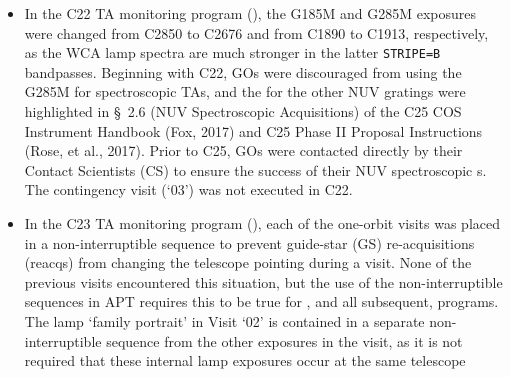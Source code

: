 \begin{itemize}
{The optional parameter \texttt{WAVECAL=YES} in the BOA$\times$MIRA target+Lamp image of the C20 program was discovered to not have taken the
expected internal lamp image in the \textsf{LC6601RYQ\_rawtag.fits} exposure. Correcting this inconsistency would have required significant APT, TRANS, and commanding changes.
As this internal calibration exposure combination is rarely executed, the C21 program included separate \texttt{TARGET=WAVE} companion lamp exposures for the target BOA exposure\footnote{The COS apertures are physically configured such that WCA light lands on the detector(s) when the PSA in place, but does not when the BOA is in place (INSERT REF). Therefore, whenever lamp images are required to verify BOA  exposures, the BOA is temporarily replaced by the PSA so that WCA light falls on the detector at the same location as it would fall for a PSA image.}
A second MIRA lamp image was added directly after the BOA$\times$MIRA , to verify the repeatability of the WCA lamp location when moving the BOA into and out of position.
To create time for the new exposures, the exposure times of the spectroscopic observations were scaled back, but still achieved the required S/N to measure the XD spectral locations.
}
\item{
In the C22 TA monitoring program (), the G185M and G285M exposures were changed from C2850 to C2676 and from C1890 to C1913, respectively,
as the WCA lamp spectra are much stronger in the latter \texttt{STRIPE=B} bandpasses. Beginning with C22, GOs were discouraged from using the G285M for spectroscopic  TAs,
and the \cenwaves{} for the other NUV gratings were highlighted in \S~2.6 (NUV Spectroscopic Acquisitions) of the C25 COS Instrument Handbook (Fox, 2017) and C25 Phase II Proposal Instructions (Rose, et al., 2017). Prior to C25, GOs were contacted directly by their Contact Scientists (CS) to ensure the success of their NUV spectroscopic s.
The contingency visit (`03') was not executed in C22.
}
\item{
In the C23 TA monitoring program (), each of the one-orbit visits was placed in a non-interruptible sequence to prevent guide-star (GS) re-acquisitions (reacqs) from changing the telescope pointing during a visit.
None of the previous visits encountered this situation, but the use of the non-interruptible sequences in APT requires this to be true for , and all subsequent, programs.
The lamp `family portrait' in Visit `02' is contained in a separate non-interruptible sequence from the other exposures in the visit, as it is not required that these internal lamp exposures occur at the same telescope
}
\end{itemize}
